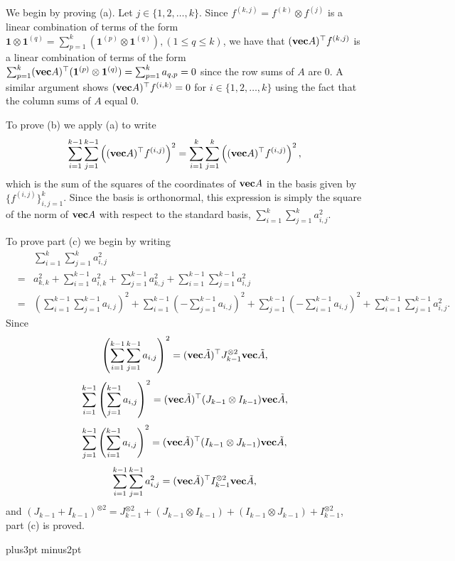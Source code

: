 \documentclass[12pt]{article}
\def\blackslug{\hbox{\kern1pt\vrule height6pt width4pt  depth1pt\kern1pt}}
\def\qed{\penalty 500\hbox{\quad\blackslug}\ifmmode\else\par
                                             \vskip4.5pt plus3pt minus2pt\fi}
\newcommand{\proofof}[1]{\par\noindent{\bf Proof of #1.\enspace}\rm}
\def\transpose{\top}
\def\mvec{{\bf vec}}
\def\onesvec{{\mathbf{1}}}
\begin{document}

\proofof{Lemma~\ref{lem:Evec3}}
We begin by proving (a).
Let  $j\in\{1,2,\ldots,k\}$. 
Since $f^{(k,j)}=f^{(k)}\otimes f^{(j)}$ is a linear
combination of terms of the form 
$\onesvec\otimes\onesvec^{(q)}=\sum_{p=1}^k(\onesvec^{(p)}\otimes\onesvec^{(q)}), (1\le q \le k)$, we have that $(\mvec A)^\transpose f^{(k,j)}$ is a linear combination of
terms of the form 
$\sum_{p=1}^k(\mvec A)^\transpose (\onesvec^{(p)}\otimes\onesvec^{(q)})
=\sum_{p=1}^k a_{q,p}=0$ since the row sums of $A$ are $0$. 
 A similar argument shows $(\mvec A)^\transpose f^{(i,k)}=0$ for 
$i\in\{1,2,\ldots,k\}$
using the fact that the column sums of $A$ equal $0$.

To prove (b) we apply (a) to write
\[
\sum_{i=1}^{k-1}\sum_{j=1}^{k-1}\left((\mvec A)^\transpose f^{(i,j)}\right)^2
=
\sum_{i=1}^{k}\sum_{j=1}^{k}\left((\mvec A)^\transpose f^{(i,j)}\right)^2,
\]
which is the sum of the squares of the coordinates of 
$\mvec A$ in the basis given by $\{f^{(i,j)}\}_{i,j=1}^k$. Since the basis
is orthonormal, this expression is simply the square of the norm of $\mvec A$
with respect to the standard basis, 
$\sum_{i=1}^k \sum_{j=1}^k a_{i,j}^2$.

To prove part (c) we begin by writing
\begin{eqnarray*}
&&\sum_{i=1}^k\sum_{j=1}^k a_{i,j}^2\\
&=&
a_{k,k}^2
+\sum_{i=1}^{k-1}a_{i,k}^2
+\sum_{j=1}^{k-1}a_{k,j}^2
+\sum_{i=1}^{k-1}\sum_{j=1}^{k-1} a_{i,j}^2\\
&=&
\left( \sum_{i=1}^{k-1}\sum_{j=1}^{k-1}a_{i,j}  \right)^2
+\sum_{i=1}^{k-1}\left(-\sum_{j=1}^{k-1}a_{i,j}\right)^2
+\sum_{j=1}^{k-1}\left(-\sum_{i=1}^{k-1}a_{i,j}\right)^2
+\sum_{i=1}^{k-1}\sum_{j=1}^{k-1}a_{i,j}^2.
\end{eqnarray*}
Since
\[
\left( \sum_{i=1}^{k-1}\sum_{j=1}^{k-1}a_{i,j}  \right)^2
=
(\mvec \tilde A)^\transpose J_{k-1}^{\otimes 2}\mvec \tilde A,
\]
\[
\sum_{i=1}^{k-1}\left(\sum_{j=1}^{k-1}a_{i,j}\right)^2
= (\mvec \tilde A)^\transpose (J_{k-1}\otimes I_{k-1}) \mvec \tilde A,
\]
\[
\sum_{j=1}^{k-1}\left(\sum_{i=1}^{k-1}a_{i,j}\right)^2
= (\mvec \tilde A)^\transpose (I_{k-1}\otimes J_{k-1}) \mvec \tilde A,
\]
\[
\sum_{i=1}^{k-1}\sum_{j=1}^{k-1}a_{i,j}^2
= (\mvec \tilde A)^\transpose I_{k-1}^{\otimes 2}\mvec \tilde A,
\]
and $(J_{k-1}+I_{k-1})^{\otimes 2} = J_{k-1}^{\otimes 2}+(J_{k-1}\otimes I_{k-1})+(I_{k-1}\otimes J_{k-1})
+I_{k-1}^{\otimes 2}$, part (c) is proved.
\qed
\end{document}
